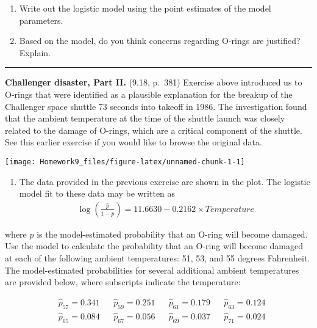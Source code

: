 \documentclass[
]{article}
\providecommand{\tightlist}{%
  \setlength{\itemsep}{0pt}\setlength{\parskip}{0pt}}
\begin{document}
\begin{enumerate}
\def\labelenumi{(\alph{enumi})}
\setcounter{enumi}{2}
\tightlist
\item
  Write out the logistic model using the point estimates of the model
  parameters.
\item
  Based on the model, do you think concerns regarding O-rings are
  justified? Explain.
\end{enumerate}

\begin{center}\rule{0.5\linewidth}{0.5pt}\end{center}

\clearpage

\textbf{Challenger disaster, Part II.} (9.18, p.~381) Exercise above
introduced us to O-rings that were identified as a plausible explanation
for the breakup of the Challenger space shuttle 73 seconds into takeoff
in 1986. The investigation found that the ambient temperature at the
time of the shuttle launch was closely related to the damage of O-rings,
which are a critical component of the shuttle. See this earlier exercise
if you would like to browse the original data.

\begin{center}

\texttt{[image: Homework9\_files/figure-latex/unnamed-chunk-1-1]} 
\end{center}

\begin{enumerate}
\def\labelenumi{(\alph{enumi})}
\tightlist
\item
  The data provided in the previous exercise are shown in the plot. The
  logistic model fit to these data may be written as \begin{align*}
  \log\left( \frac{\hat{p}}{1 - \hat{p}} \right) = 11.6630 - 0.2162\times Temperature
  \end{align*}
\end{enumerate}

where \(\hat{p}\) is the model-estimated probability that an O-ring will
become damaged. Use the model to calculate the probability that an
O-ring will become damaged at each of the following ambient
temperatures: 51, 53, and 55 degrees Fahrenheit. The model-estimated
probabilities for several additional ambient temperatures are provided
below, where subscripts indicate the temperature:

\begin{align*}
&\hat{p}_{57} = 0.341
    && \hat{p}_{59} = 0.251
    && \hat{p}_{61} = 0.179
    && \hat{p}_{63} = 0.124 \\
&\hat{p}_{65} = 0.084
    && \hat{p}_{67} = 0.056
    && \hat{p}_{69} = 0.037
    && \hat{p}_{71} = 0.024
\end{align*}
\end{document}
